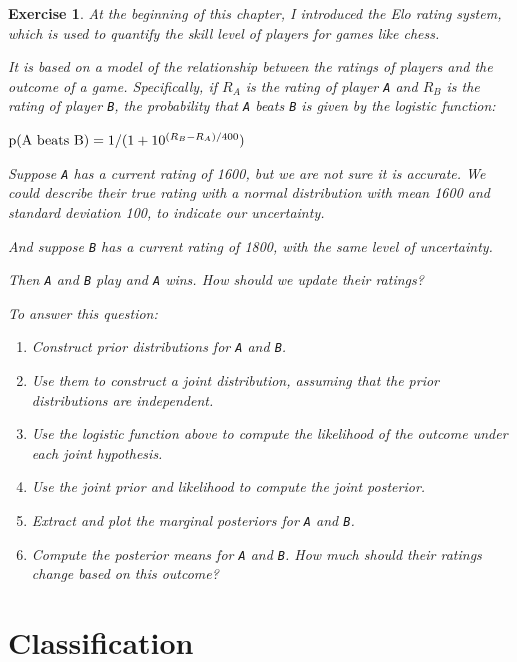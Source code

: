 \documentclass[12pt]{book}
\theoremstyle{exercise}
\newtheorem{exercise}{Exercise}[chapter]
\newcommand{\py}[1]{{\tt #1}}%
\begin{document}
\begin{exercise}
At the beginning of this chapter, I introduced
the Elo rating system, which is used to quantify the skill level of players for games like chess.

It is based on a model of the relationship between the ratings of players and the outcome of a game.  Specifically, if $R_A$ is the rating of player \py{A} and $R_B$ is the rating of player \py{B}, the probability that \py{A} beats \py{B} is given by the logistic function:

$\mathrm{p}(\mathrm{A~beats~B}) = 1 / (1 + 10^{(R_B-R_A)/400})$

Suppose \py{A} has a current rating of 1600, but we are not sure it is accurate.  We could describe their true rating with a normal distribution with mean 1600 and standard deviation 100, to indicate our uncertainty.

And suppose \py{B} has a current rating of 1800, with the same level of uncertainty.

Then \py{A} and \py{B} play and \py{A} wins.  How should we update their ratings?

To answer this question:

\begin{enumerate}

\item Construct prior distributions for \py{A} and \py{B}.

\item Use them to construct a joint distribution, assuming that the prior distributions are independent.

\item Use the logistic function above to compute the likelihood of the outcome under each joint hypothesis.

\item Use the joint prior and likelihood to compute the joint posterior.

\item Extract and plot the marginal posteriors for \py{A} and \py{B}.

\item Compute the posterior means for \py{A} and \py{B}.  How much should their ratings change based on this outcome?

\end{enumerate}

\end{exercise}



\chapter{Classification}
\label{classification}
\end{document}
